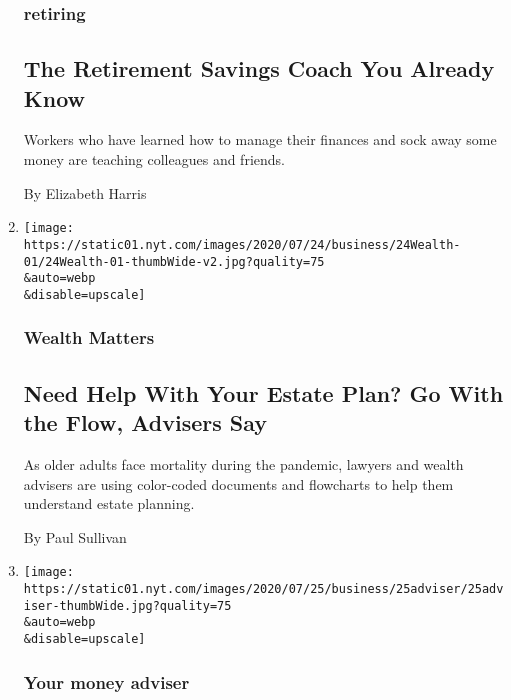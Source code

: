 \begin{enumerate}
  \hypertarget{retiring}{%
  \subsubsection{retiring}\label{retiring}}

  \hypertarget{the-retirement-savings-coach-you-already-know}{%
  \subsection{The Retirement Savings Coach You Already
  Know}\label{the-retirement-savings-coach-you-already-know}}

  Workers who have learned how to manage their finances and sock away
  some money are teaching colleagues and friends.

  By Elizabeth Harris
\item
  \href{/2020/07/24/your-money/need-help-with-your-estate-plan-go-with-the-flow-advisers-say.html}{}

  \texttt{[image: https://static01.nyt.com/images/2020/07/24/business/24Wealth-01/24Wealth-01-thumbWide-v2.jpg?quality=75\\\&auto=webp\\\&disable=upscale]}

  \hypertarget{wealth-matters-1}{%
  \subsubsection{Wealth Matters}\label{wealth-matters-1}}

  \hypertarget{need-help-with-your-estate-plan-go-with-the-flow-advisers-say}{%
  \subsection{Need Help With Your Estate Plan? Go With the Flow,
  Advisers
  Say}\label{need-help-with-your-estate-plan-go-with-the-flow-advisers-say}}

  As older adults face mortality during the pandemic, lawyers and wealth
  advisers are using color-coded documents and flowcharts to help them
  understand estate planning.

  By Paul Sullivan
\item
  \href{/2020/07/24/your-money/back-to-school-tax-holiday-coronavirus.html}{}

  \texttt{[image: https://static01.nyt.com/images/2020/07/25/business/25adviser/25adviser-thumbWide.jpg?quality=75\\\&auto=webp\\\&disable=upscale]}

  \hypertarget{your-money-adviser}{%
  \subsubsection{Your money adviser}\label{your-money-adviser}}


\end{enumerate}
